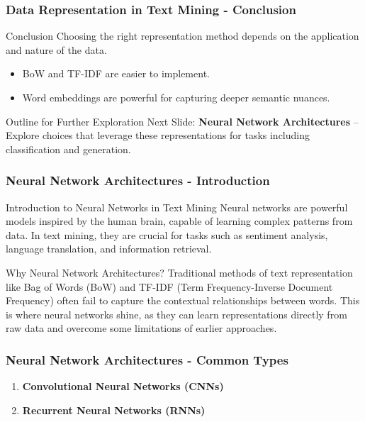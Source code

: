 \documentclass[aspectratio=169]{beamer}
\begin{document}
\begin{frame}[fragile]
    \frametitle{Data Representation in Text Mining - Conclusion}
    \begin{block}{Conclusion}
        Choosing the right representation method depends on the application and nature of the data. 
        \begin{itemize}
            \item BoW and TF-IDF are easier to implement.
            \item Word embeddings are powerful for capturing deeper semantic nuances.
        \end{itemize}
    \end{block}
    \begin{block}{Outline for Further Exploration}
        Next Slide: \textbf{Neural Network Architectures} – Explore choices that leverage these representations for tasks including classification and generation.
    \end{block}
\end{frame}

\begin{frame}
    \frametitle{Neural Network Architectures - Introduction}
    \begin{block}{Introduction to Neural Networks in Text Mining}
        Neural networks are powerful models inspired by the human brain, capable of learning complex patterns from data. In text mining, they are crucial for tasks such as sentiment analysis, language translation, and information retrieval.
    \end{block}

    \begin{block}{Why Neural Network Architectures?}
        Traditional methods of text representation like Bag of Words (BoW) and TF-IDF (Term Frequency-Inverse Document Frequency) often fail to capture the contextual relationships between words. This is where neural networks shine, as they can learn representations directly from raw data and overcome some limitations of earlier approaches.
    \end{block}
\end{frame}

\begin{frame}
    \frametitle{Neural Network Architectures - Common Types}
    \begin{enumerate}
        \item \textbf{Convolutional Neural Networks (CNNs)}
        \item \textbf{Recurrent Neural Networks (RNNs)}
    \end{enumerate}
\end{frame}
\end{document}
